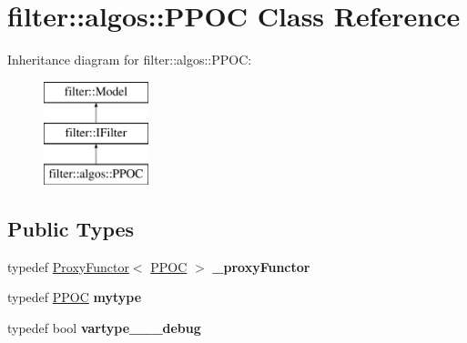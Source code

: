 \hypertarget{classfilter_1_1algos_1_1_p_p_o_c}{}\section{filter\+:\+:algos\+:\+:P\+P\+OC Class Reference}
\label{classfilter_1_1algos_1_1_p_p_o_c}
Inheritance diagram for filter\+:\+:algos\+:\+:P\+P\+OC\+:\begin{figure}[H]
\begin{center}
\leavevmode
\includegraphics[height=3.000000cm]{d8/d64/classfilter_1_1algos_1_1_p_p_o_c}
\end{center}
\end{figure}
\subsection*{Public Types}
\begin{DoxyCompactItemize}
\item 
\mbox{\label{classfilter_1_1algos_1_1_p_p_o_c_a12efae6bd538caf48619faa45115d999}} 
typedef \hyperlink{class_proxy_functor}{Proxy\+Functor}$<$ \hyperlink{classfilter_1_1algos_1_1_p_p_o_c}{P\+P\+OC} $>$ {\bfseries \+\_\+proxy\+Functor}
\item 
\mbox{\label{classfilter_1_1algos_1_1_p_p_o_c_a201193444d9863939118a79dabe51036}} 
typedef \hyperlink{classfilter_1_1algos_1_1_p_p_o_c}{P\+P\+OC} {\bfseries mytype}
\item 
\mbox{\label{classfilter_1_1algos_1_1_p_p_o_c_a294c4fdcbfbc97b7ebfda5d655b75913}} 
typedef bool {\bfseries vartype\+\_\+\+\_\+\+\_\+debug}
\end{DoxyCompactItemize}
